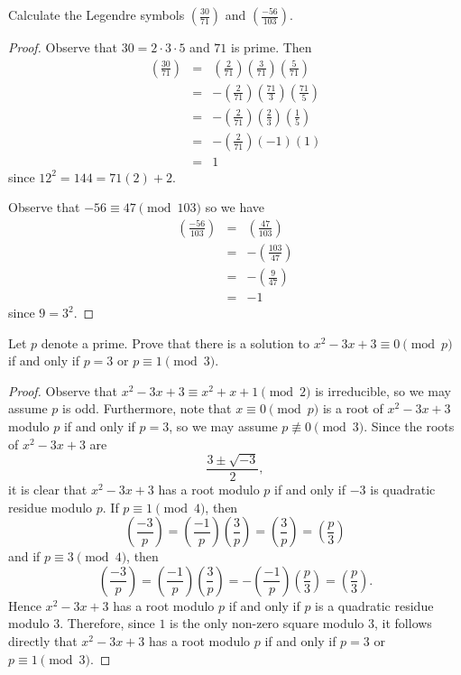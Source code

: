\documentclass[10pt]{amsart}
\begin{document}
\begin{thm}\label{ex3}
  Calculate the Legendre symbols $\left(\frac{30}{71}\right)$ and $\left(\frac{-56}{103}\right)$.

  \begin{proof}
    Observe that $30 = 2\cdot 3 \cdot 5$  and $71$ is prime.
    Then 
    \begin{eqnarray*}
      \left(\frac{30}{71}\right) &=& \left(\frac{2}{71}\right)\left(\frac{3}{71}\right)\left(\frac{5}{71}\right)\\
      &=& -\left(\frac{2}{71}\right)\left(\frac{71}{3}\right)\left(\frac{71}{5}\right) \\
      &=& -\left(\frac{2}{71}\right)\left(\frac{2}{3}\right)\left(\frac{1}{5}\right)\\
      &=& -\left(\frac{2}{71}\right)(-1)(1)\\
      &=& 1
      \end{eqnarray*}
    since $12^2 = 144 = 71(2) + 2$.
    
    Observe that $-56 \equiv 47 \pmod{103}$ so we have
    \begin{eqnarray*}
      \left(\frac{-56}{103}\right) &=& \left(\frac{47}{103}\right)\\
      &=& -\left(\frac{103}{47}\right)\\
      &=& -\left(\frac{9}{47}\right)\\
      &=& -1
    \end{eqnarray*}
    since $9 = 3^2$.
  \end{proof}
\end{thm}
\begin{thm}\label{ex4}
  Let $p$ denote a prime.
  Prove that there is a solution to $x^2 - 3x + 3 \equiv 0 \pmod{p}$ if and only if $p = 3$ or $p \equiv 1 \pmod{3}$.

  \begin{proof}
    Observe that $x^2 - 3x + 3 \equiv x^2 + x + 1 \pmod{2}$ is irreducible, so we may assume $p$ is odd.
    Furthermore, note that $x \equiv 0 \pmod{p}$ is a root of $x^2 - 3x + 3$ modulo $p$ if and only if $p = 3$, so we may assume $p \not \equiv 0 \pmod{3}$.
    Since the roots of $x^2 - 3x + 3$ are 
    $$\frac{3 \pm \sqrt{-3}}{2},$$
    it is clear that $x^2 - 3x + 3$ has a root modulo $p$ if and only if $-3$ is quadratic residue modulo $p$.
    If $p \equiv 1 \pmod{4}$, then 
    $$\left(\frac{-3}{p}\right) = \left(\frac{-1}{p}\right)\left(\frac{3}{p}\right) = \left(\frac{3}{p}\right) = \left(\frac{p}{3}\right)$$
    and if $p \equiv 3 \pmod{4}$, then
    $$\left(\frac{-3}{p}\right) = \left(\frac{-1}{p}\right)\left(\frac{3}{p}\right) = -\left(\frac{-1}{p}\right)\left(\frac{p}{3}\right) = \left(\frac{p}{3}\right).$$
    Hence $x^2 - 3x + 3$ has a root modulo $p$ if and only if $p$ is a quadratic residue modulo $3$.
    Therefore, since $1$ is the only non-zero square modulo $3$, it follows directly that $x^2 - 3x + 3$ has a root modulo $p$ if and only if $p = 3$ or $p \equiv 1 \pmod{3}$.
  \end{proof}
\end{thm}
\end{document}
